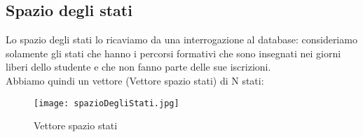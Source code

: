 \documentclass[10pt,a4paper]{article}
\begin{document}
  
    \subsection{Spazio degli stati}
      \label{spazioDegliStatiSubsection}
      Lo spazio degli stati lo ricaviamo da una interrogazione al database: consideriamo solamente gli stati che hanno i percorsi formativi 
      che sono insegnati nei giorni liberi dello studente e che non fanno parte delle sue iscrizioni.\\
      Abbiamo quindi un vettore (Vettore spazio stati) di N stati:\\
      \begin{figure}[h!]
        \centering
        \caption{Vettore spazio stati}
        \texttt{[image: spazioDegliStati.jpg]}
        \label{vettoreStati}
      \end{figure}
      
      \newpage
      
  
\end{document}
